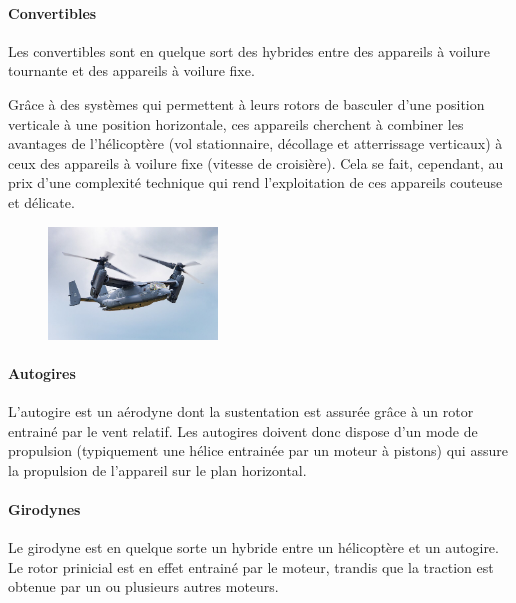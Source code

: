 		\paragraph{Convertibles}
		Les convertibles  sont en quelque sort des hybrides entre des appareils à voilure tournante et des appareils à voilure fixe.
		
		Grâce à des systèmes qui permettent à leurs rotors de basculer d'une position verticale à une position horizontale, ces appareils cherchent à combiner les avantages de l'hélicoptère (vol stationnaire, décollage et atterrissage verticaux) à ceux des appareils à voilure fixe (vitesse de croisière). Cela se fait, cependant, au prix d'une complexité technique qui rend l'exploitation de ces appareils couteuse et délicate.
		
	\begin{figure}[H]
  	\centering
    \includegraphics[width=0.4\textwidth]{01-EtudeAeronefs/img/tiltrotor.jpg}
	\end{figure}	
		
		\paragraph{Autogires}
		L'autogire  est un aérodyne dont la sustentation est assurée grâce à un rotor entrainé par le vent relatif. Les autogires doivent donc dispose d'un mode de propulsion (typiquement une hélice entrainée par un moteur à pistons) qui assure la propulsion de l'appareil sur le plan horizontal.
		
	
	\paragraph{Girodynes}
	Le girodyne  est en quelque sorte un hybride entre un hélicoptère et un autogire. Le rotor prinicial est en effet entrainé par le moteur, trandis que la traction est obtenue par un ou plusieurs autres moteurs.
	
